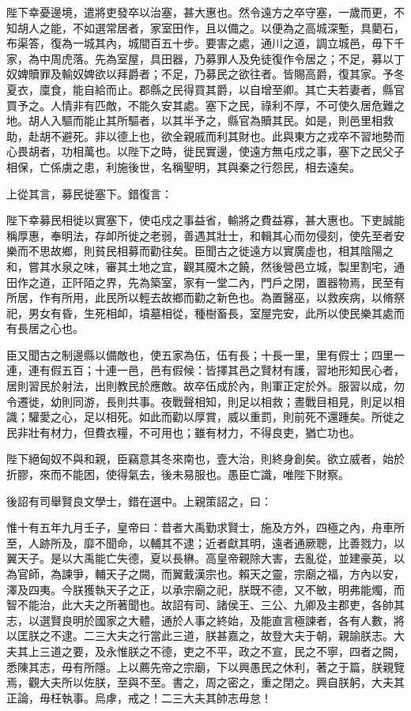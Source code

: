 \begin{pinyinscope}
陛下幸憂邊境，遣將吏發卒以治塞，甚大惠也。然令遠方之卒守塞，一歲而更，不知胡人之能，不如選常居者，家室田作，且以備之。以便為之高城深塹，具藺石，布渠答，復為一城其內，城間百五十步。要害之處，通川之道，調立城邑，毋下千家，為中周虎落。先為室屋，具田器，乃募罪人及免徒復作令居之；不足，募以丁奴婢贖罪及輸奴婢欲以拜爵者；不足，乃募民之欲往者。皆賜高爵，復其家。予冬夏衣，廩食，能自給而止。郡縣之民得買其爵，以自增至卿。其亡夫若妻者，縣官買予之。人情非有匹敵，不能久安其處。塞下之民，祿利不厚，不可使久居危難之地。胡人入驅而能止其所驅者，以其半予之，縣官為贖其民。如是，則邑里相救助，赴胡不避死。非以德上也，欲全親戚而利其財也。此與東方之戎卒不習地勢而心畏胡者，功相萬也。以陛下之時，徙民實邊，使遠方無屯戍之事，塞下之民父子相保，亡係虜之患，利施後世，名稱聖明，其與秦之行怨民，相去遠矣。

上從其言，募民徙塞下。錯復言：

陛下幸募民相徙以實塞下，使屯戍之事益省，輸將之費益寡，甚大惠也。下吏誠能稱厚惠，奉明法，存卹所徙之老弱，善遇其壯士，和輯其心而勿侵刻，使先至者安樂而不思故鄉，則貧民相募而勸往矣。臣聞古之徙遠方以實廣虛也，相其陰陽之和，嘗其水泉之味，審其土地之宜，觀其魇木之饒，然後營邑立城，製里割宅，通田作之道，正阡陌之界，先為築室，家有一堂二內，門戶之閉，置器物焉，民至有所居，作有所用，此民所以輕去故鄉而勸之新色也。為置醫巫，以救疾病，以脩祭祀，男女有昏，生死相卹，墳墓相從，種樹畜長，室屋完安，此所以使民樂其處而有長居之心也。

臣又聞古之制邊縣以備敵也，使五家為伍，伍有長；十長一里，里有假士；四里一連，連有假五百；十連一邑，邑有假候：皆擇其邑之賢材有護，習地形知民心者，居則習民於射法，出則教民於應敵。故卒伍成於內，則軍正定於外。服習以成，勿令遷徙，幼則同游，長則共事。夜戰聲相知，則足以相救；晝戰目相見，則足以相識；驩愛之心，足以相死。如此而勸以厚賞，威以重罰，則前死不還踵矣。所徙之民非壯有材力，但費衣糧，不可用也；雖有材力，不得良吏，猶亡功也。

陛下絕匈奴不與和親，臣竊意其冬來南也，壹大治，則終身創矣。欲立威者，始於折膠，來而不能困，使得氣去，後未易服也。愚臣亡識，唯陛下財察。

後詔有司舉賢良文學士，錯在選中。上親策詔之，曰：

惟十有五年九月壬子，皇帝曰：昔者大禹勤求賢士，施及方外，四極之內，舟車所至，人跡所及，靡不聞命，以輔其不逮；近者獻其明，遠者通厥聰，比善戮力，以翼天子。是以大禹能亡失德，夏以長楙。高皇帝親除大害，去亂從，並建豪英，以為官師，為諫爭，輔天子之闕，而翼戴漢宗也。賴天之靈，宗廟之福，方內以安，澤及四夷。今朕獲執天子之正，以承宗廟之祀，朕既不德，又不敏，明弗能燭，而智不能治，此大夫之所著聞也。故詔有司、諸侯王、三公、九卿及主郡吏，各帥其志，以選賢良明於國家之大體，通於人事之終始，及能直言極諫者，各有人數，將以匡朕之不逮。二三大夫之行當此三道，朕甚嘉之，故登大夫于朝，親諭朕志。大夫其上三道之要，及永惟朕之不德，吏之不平，政之不宣，民之不寧，四者之闕，悉陳其志，毋有所隱。上以薦先帝之宗廟，下以興愚民之休利，著之于篇，朕親覽焉，觀大夫所以佐朕，至與不至。書之，周之密之，重之閉之。興自朕躬，大夫其正論，毋枉執事。烏虖，戒之！二三大夫其帥志毋怠！


\end{pinyinscope}
